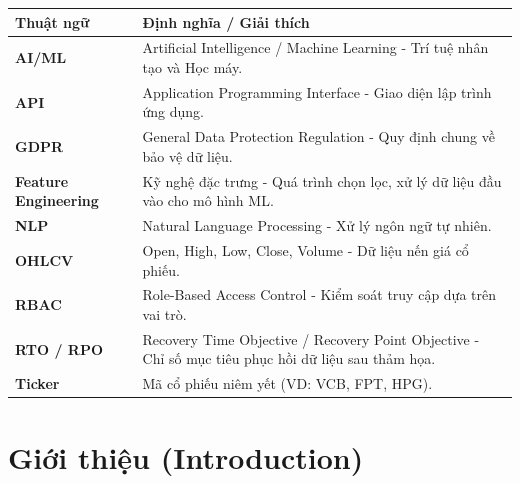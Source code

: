 \documentclass[12pt, a4paper]{article}
\begin{document}
\begin{table}[htbp]
    \centering
    \renewcommand{\arraystretch}{1.5}
    \begin{tabularx}{\textwidth}{|l|X|}
        \hline
        \rowcolor{gray!20}
        \textbf{Thuật ngữ}           & \textbf{Định nghĩa / Giải thích}                                                                    \\
        \hline
        \textbf{AI/ML}               & Artificial Intelligence / Machine Learning - Trí tuệ nhân tạo và Học máy.                           \\
        \hline
        \textbf{API}                 & Application Programming Interface - Giao diện lập trình ứng dụng.                                   \\
        \hline
        \textbf{GDPR}                & General Data Protection Regulation - Quy định chung về bảo vệ dữ liệu.                              \\
        \hline
        \textbf{Feature Engineering} & Kỹ nghệ đặc trưng - Quá trình chọn lọc, xử lý dữ liệu đầu vào cho mô hình ML.                       \\
        \hline
        \textbf{NLP}                 & Natural Language Processing - Xử lý ngôn ngữ tự nhiên.                                              \\
        \hline
        \textbf{OHLCV}               & Open, High, Low, Close, Volume - Dữ liệu nến giá cổ phiếu.                                          \\
        \hline
        \textbf{RBAC}                & Role-Based Access Control - Kiểm soát truy cập dựa trên vai trò.                                    \\
        \hline
        \textbf{RTO / RPO}           & Recovery Time Objective / Recovery Point Objective - Chỉ số mục tiêu phục hồi dữ liệu sau thảm họa. \\
        \hline
        \textbf{Ticker}              & Mã cổ phiếu niêm yết (VD: VCB, FPT, HPG).                                                           \\
        \hline
    \end{tabularx}
\end{table}

\newpage

\section{Giới thiệu (Introduction)}
\end{document}
